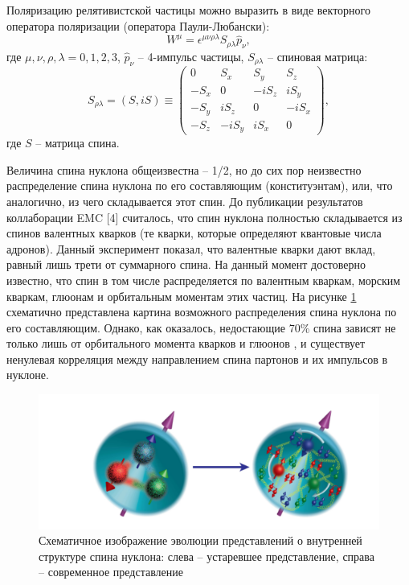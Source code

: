 \documentclass{extarticle}
\begin{document}
Поляризацию релятивистской частицы можно выразить в виде векторного оператора поляризации (оператора Паули-Любански):
\begin{equation}
	W^\mu = \epsilon^{\mu\nu\rho\lambda}S_{\rho\lambda}\hat{p}_\nu,
\end{equation}
где $\mu, \nu, \rho, \lambda = 0, 1, 2, 3$, $\hat{p}_\nu$ -- 4-импульс частицы, $S_{\rho\lambda}$ -- спиновая матрица:
\begin{equation}
	S_{\rho\lambda} = (S, iS) \equiv \begin{pmatrix}
		0&S_x&S_y&S_z\\-S_x&0&-iS_z&iS_y\\-S_y&iS_z&0&-iS_x\\-S_z&-iS_y&iS_x&0
	\end{pmatrix},
\end{equation}
где $S$ -- матрица спина.


 Величина спина нуклона общеизвестна – 1/2, но до сих пор неизвестно распределение спина нуклона по его составляющим (конституэнтам), или, что аналогично, из чего складывается этот спин. До публикации результатов коллаборации EMC [4] считалось, что спин нуклона полностью складывается из спинов валентных кварков (те кварки, которые определяют квантовые числа адронов). Данный эксперимент показал, что валентные кварки дают вклад, равный лишь трети от суммарного спина. На данный момент достоверно известно, что спин в том числе распределяется по валентным кваркам, морским кваркам, глюонам и орбитальным моментам этих частиц. На рисунке \ref{fig:nucleo} схематично представлена картина возможного распределения спина нуклона по его составляющим.
 Однако, как оказалось, недостающие 70\% спина зависят не только лишь от орбитального момента кварков и глюонов \cite{Hagler}, и существует ненулевая корреляция между направлением спина партонов и их импульсов в нуклоне. 

\begin{figure}[ht]
    \centering
    \includegraphics[width = 0.9\linewidth]{nucleo.png}
    \caption{Схематичное изображение эволюции представлений о внутренней структуре спина нуклона: слева – устаревшее представление, справа – современное представление}
    \label{fig:nucleo}
\end{figure}
 
\end{document}
